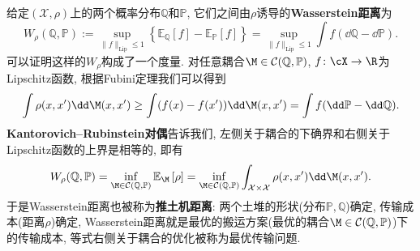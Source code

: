 给定$(\mathcal{X}, \rho)$上的两个概率分布$\mathbb{Q}$和$\mathbb{P}$, 它们之间由$\rho$诱导的\textbf{Wasserstein距离}为
\begin{equation*}
	W_{\rho}(\mathbb{Q}, \mathbb{P}) 
	:= \sup_{\|f\|_{\text{Lip}} \leq 1} \left\{ \mathbb{E}_{\mathbb{Q}} [f] - \mathbb{E}_{\mathbb{P}} [f] \right\}
	= \sup_{\|f\|_{\text{Lip}} \leq 1} \int f (\dd \mathbb{Q} - \dd \mathbb{P}). 
\end{equation*}
可以证明这样的$W_{\rho}$构成了一个度量. 
对任意耦合$\M \in \mathcal{C}(\mathbb{Q}, \mathbb{P})$, $f \colon \cX \to \R$为Lipschitz函数, 根据Fubini定理我们可以得到
\begin{equation*}
	\int \rho(x, x') \dd \M(x, x')
	\geq \int (f(x) - f(x')) \dd \M(x, x')
	= \int f(\dd \mathbb{P} - \dd \mathbb{Q}). 
\end{equation*}
\textbf{Kantorovich–Rubinstein对偶}告诉我们, 左侧关于耦合的下确界和右侧关于Lipschitz函数的上界是相等的, 即有
\begin{equation*}
	W_{\rho}(\mathbb{Q}, \mathbb{P})
	= \inf_{\M \in \mathcal{C}(\mathbb{Q}, \mathbb{P})} \mathbb{E}_{\M} \left[ \rho \right]
	= \inf_{\M \in \mathcal{C}(\mathbb{Q}, \mathbb{P})} \int_{\mathcal{X} \times \mathcal{X}} \rho(x, x') \dd \M(x, x'). 
\end{equation*}
于是Wasserstein距离也被称为\textbf{推土机距离}: 两个土堆的形状(分布$\mathbb{P}, \mathbb{Q}$)确定, 传输成本(距离$\rho$)确定, Wasserstein距离就是最优的搬运方案(最优的耦合$\M \in \mathcal{C}(\mathbb{Q}, \mathbb{P})$)下的传输成本, 等式右侧关于耦合的优化被称为最优传输问题. 

